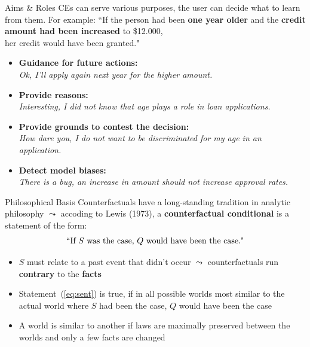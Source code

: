 \documentclass[11pt,compress,t,notes=noshow, aspectratio=169, xcolor=table]{beamer}
\begin{document}
\begin{frame}[c]{Aims \& Roles}
	CEs can serve various purposes, the user can decide what to learn from them. For example:\newline
	``If the person had been \textbf{one year older} and the \textbf{credit amount had been increased} to \$12.000,\\ her credit would have been granted."  \\[0.2cm]
	\begin{itemize}
		\itemsep1.3em
		\item \textbf{Guidance for future actions:}\\ \textit{Ok, I'll apply again next year for the higher amount.}
		\item \textbf{Provide reasons:}\\ \textit{Interesting, I did not know that age plays a role in loan applications.}
		\item \textbf{Provide grounds to contest the decision:}\\ \textit{How dare you, I do not want to be discriminated for my age in an application.}
		\item \textbf{Detect model biases:}\\ \textit{There is a bug, an increase in amount should not increase approval rates.}
	\end{itemize}
\end{frame}


\begin{frame}{Philosophical Basis}
Counterfactuals have a long-standing tradition in analytic philosophy $\leadsto$ %
accoding to Lewis (1973), a \textbf{counterfactual conditional} is a statement of the form:
\begin{equation}
		\textnormal{``If $S$ was the case, $Q$ would have been the case."}
		\label{eq:sent}
\end{equation}
	\begin{itemize}
		\item $S$ must relate to a past event that didn't occur $\leadsto$ counterfactuals run \textbf{contrary} to the \textbf{facts}
		\item Statement~(\ref{eq:sent}) is true, if in all possible worlds most similar to the actual world where $S$ had been the case, $Q$ would have been the case
		\item A world is similar to another if laws are maximally preserved between the worlds and only a few facts are changed
	\end{itemize}
\end{frame}
\end{document}
